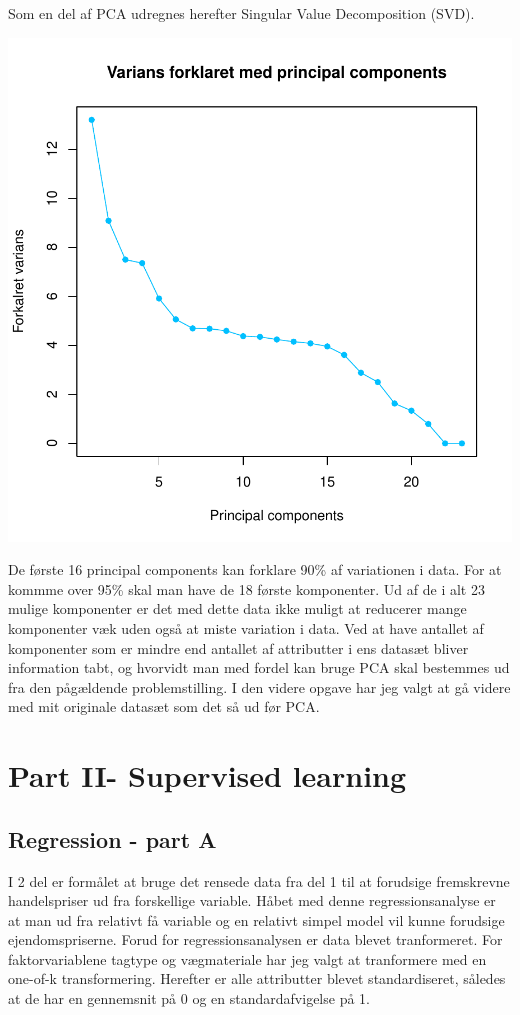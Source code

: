 \documentclass{report}
\begin{document}
Som en del af PCA udregnes herefter Singular Value Decomposition (SVD).

\includegraphics{rapport_latex-006}

De første 16 principal components kan forklare 90\% af variationen i data. For at kommme over 95\% skal man have de 18 første komponenter. Ud af de i alt 23 mulige komponenter er det med dette data ikke muligt at reducerer mange komponenter væk uden også at miste variation i data. 
Ved at have antallet af komponenter som er mindre end antallet af attributter i ens datasæt bliver information tabt, og hvorvidt man med fordel kan bruge PCA skal bestemmes ud fra den pågældende problemstilling. I den videre opgave har jeg valgt at gå videre med mit originale datasæt som det så ud før PCA. 

\chapter{Part II- Supervised learning}

\section{Regression - part A}
I 2 del er formålet at bruge det rensede data fra del 1 til at forudsige fremskrevne handelspriser ud fra forskellige variable. 
Håbet med denne regressionsanalyse er at man ud fra relativt få variable og en relativt simpel model vil kunne forudsige ejendomspriserne. 
Forud for regressionsanalysen er data blevet tranformeret. For faktorvariablene tagtype og vægmateriale har jeg valgt at tranformere med en one-of-k transformering. Herefter er alle attributter blevet standardiseret, således at de har en gennemsnit på 0 og en standardafvigelse på 1. 
\end{document}
